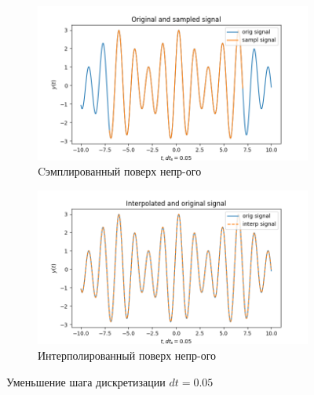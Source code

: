 \documentclass[a4paper, 12pt]{article}
\begin{document}
    \begin{figure}[H]
        \centering
        \begin{subfigure}{0.45\textwidth}
            \centering
            \includegraphics[width=\linewidth]{3_sine.png}
            \caption{Cэмплированный поверх непр-ого}
            \label{fig:3sine}
        \end{subfigure}
        \hspace{5mm}
        \begin{subfigure}{0.45\textwidth}
            \centering
            \includegraphics[width=\linewidth]{3_isine.png}
            \caption{Интерполированный поверх непр-ого}
            \label{fig:3isine}
        \end{subfigure}
        \caption{Уменьшение шага дискретизации $dt=0.05$}
        \label{fig:sines3}
    \end{figure}
\end{document}
